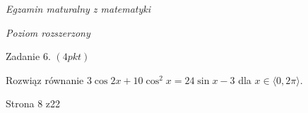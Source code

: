\documentclass[a4paper,12pt]{article}
\begin{document}
{\it Egzamin maturalny z matematyki}

{\it Poziom rozszerzony}

Zadanie 6. $(4pkt)$

Rozwiąz równanie $3\cos 2x+10\cos^{2}x=24\sin x-3$ dla $x\in\langle 0, 2\pi\rangle.$

Strona 8 z22
\end{document}
